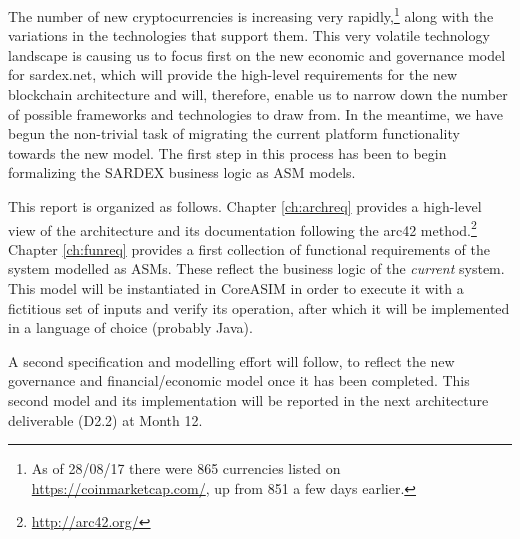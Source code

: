 The number of new cryptocurrencies is increasing very rapidly,\footnote{As of 28/08/17 there were 865 currencies listed on \url{https://coinmarketcap.com/}, up from 851 a few days earlier.} along with the variations in the technologies that support them. This very volatile technology landscape is causing us to focus first on the new economic and governance model for sardex.net, which will provide the high-level requirements for the new blockchain architecture and will, therefore, enable us to narrow down the number of possible frameworks and technologies to draw from. In the meantime, we have begun the non-trivial task of migrating the current platform functionality towards the new model. The first step in this process has been to begin formalizing the SARDEX business logic as ASM models.

This report is organized as follows. Chapter \ref{ch:archreq} provides a high-level view of the architecture and its documentation following the arc42 method.\footnote{\url{http://arc42.org/}} Chapter \ref{ch:funreq} provides a first collection of functional requirements of the system modelled as ASMs. These reflect the business logic of the \emph{current} system. This model will be instantiated in CoreASIM in order to execute it with a fictitious set of inputs and verify its operation, after which it will be implemented in a language of choice (probably Java).

A second specification and modelling effort will follow, to reflect the new governance and financial/economic model once it has been completed. This second model and its implementation will be reported in the next architecture deliverable (D2.2) at Month 12.











